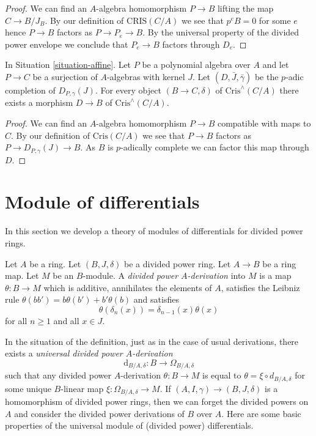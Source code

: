 \begin{proof}
We can find an $A$-algebra homomorphism $P \to B$
lifting the map $C \to B/J_B$. By our definition of
$\text{CRIS}(C/A)$ we see that $p^eB = 0$ for
some $e$ hence $P \to B$ factors as $P \to P_e \to B$.
By the universal property of the divided power envelope we
conclude that $P_e \to B$ factors through $D_e$.
\end{proof}

\begin{lemma}
\label{lemma-generator-completion}
In Situation \ref{situation-affine}.
Let $P$ be a polynomial algebra over $A$ and let
$P \to C$ be a surjection of $A$-algebras with kernel $J$.
Let $(D, \bar J, \bar\gamma)$ be the $p$-adic completion of
$D_{P, \gamma}(J)$. For every object $(B \to C, \delta)$ of
$\text{Cris}^\wedge(C/A)$ there
exists a morphism $D \to B$ of $\text{Cris}^\wedge(C/A)$.
\end{lemma}

\begin{proof}
We can find an $A$-algebra homomorphism $P \to B$ compatible
with maps to $C$. By our definition of
$\text{Cris}(C/A)$ we see that $P \to B$ factors as
$P \to D_{P, \gamma}(J) \to B$. As $B$ is $p$-adically complete
we can factor this map through $D$.
\end{proof}



\section{Module of differentials}
\label{section-differentials}

\noindent
In this section we develop a theory of modules of differentials
for divided power rings.

\begin{definition}
\label{definition-derivation}
Let $A$ be a ring. Let $(B, J, \delta)$ be a divided power ring.
Let $A \to B$ be a ring map. Let $M$ be an $B$-module.
A {\it divided power $A$-derivation} into $M$ is a map
$\theta : B \to M$ which is additive, annihilates the elements
of $A$, satisfies the Leibniz rule
$\theta(bb') = b\theta(b') + b'\theta(b)$ and satisfies
$$
\theta(\delta_n(x)) = \delta_{n - 1}(x)\theta(x)
$$
for all $n \geq 1$ and all $x \in J$.
\end{definition}

\noindent
In the situation of the definition, just as in the case of usual
derivations, there exists a {\it universal divided power $A$-derivation}
$$
\text{d}_{B/A, \delta} : B \to \Omega_{B/A, \delta}
$$
such that any divided power $A$-derivation $\theta : B \to M$ is equal to
$\theta = \xi \circ d_{B/A, \delta}$ for some unique $B$-linear map
$\xi : \Omega_{B/A, \delta} \to M$. If $(A, I, \gamma) \to (B, J, \delta)$
is a homomorphism of divided power rings, then we can forget the
divided powers on $A$ and consider the divided power derivations of
$B$ over $A$. Here are some basic properties of the universal
module of (divided power) differentials.

